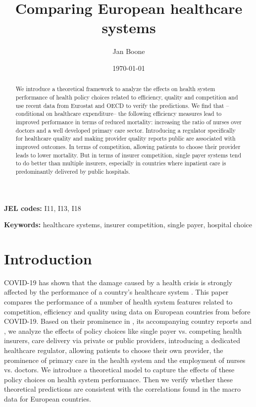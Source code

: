\documentclass[a4paper,12pt]{article}
\author{Jan Boone\inst{*}}
\date{\today}
\title{Comparing European healthcare systems}
\begin{document}
\maketitle
\begin{abstract}
We introduce a theoretical framework to analyze the effects on health system performance of health policy choices related to efficiency, quality and competition and use recent data from Eurostat and OECD to verify the predictions. We find that --conditional on healthcare expenditure-- the following efficiency measures lead to improved performance in terms of reduced mortality:  increasing the ratio of nurses over doctors and a well developed primary care sector. Introducing a regulator specifically for healthcare quality and making provider quality reports public are associated with improved outcomes. In terms of competition, allowing patients to choose their provider leads to lower mortality. But in terms of insurer competition, single payer systems tend to do better than multiple insurers, especially in countries where inpatient care is predominantly delivered by public hospitals.
\end{abstract}

\textbf{JEL codes:} I11, I13, I18

\textbf{Keywords:} healthcare systems, insurer competition, single payer, hospital choice


\vspace*{\fill}

\newpage

\section{Introduction}
\label{sec:org1ba221c}

COVID-19 has shown that the damage caused by a health crisis is strongly affected by the performance of a country's healthcare system \citep{OECD_2020}. This paper compares the performance of a number of health system features related to competition, efficiency and quality using data on European countries from before COVID-19. Based on their prominence in \cite{countryprofileReport}, its accompanying country reports and \cite{OECD_2020}, we analyze the effects of policy choices like single payer vs. competing health insurers, care delivery via private or public providers, introducing a dedicated healthcare regulator, allowing patients to choose their own provider, the prominence of primary care in the health system and the employment of nurses vs. doctors. We introduce a theoretical model to capture the effects of these policy choices on health system performance. Then we verify whether these theoretical predictions are consistent with the correlations found in the macro data for European countries.
\end{document}
